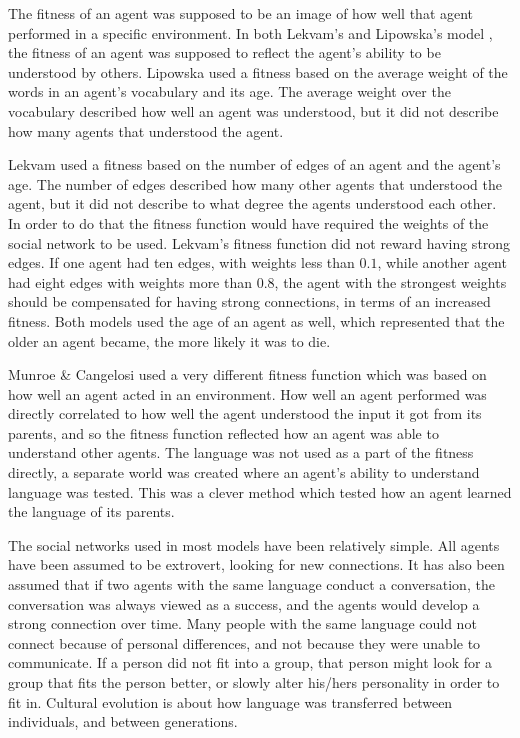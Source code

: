 The fitness of an agent was supposed to be an image of how well that agent performed in a specific environment. In both Lekvam’s \citep{lekvam2014co} and Lipowska’s model \citep{lipowska2011naming}, the fitness of an agent was supposed to reflect the agent’s ability to be understood by others. Lipowska used a fitness based on the average weight of the words in an agent’s vocabulary and its age. The average weight over the vocabulary described how well an agent was understood, but it did not describe how many agents that understood the agent. 

Lekvam used a fitness based on the number of edges of an agent and the agent’s age. The number of edges described how many other agents that understood the agent, but it did not describe to what degree the agents understood each other. In order to do that the fitness function would have required the weights of the social network to be used. Lekvam’s fitness function did not reward having strong edges. If one agent had ten edges, with weights less than $0.1$, while another agent had eight edges with weights more than $0.8$, the agent with the strongest weights should be compensated for having strong connections, in terms of an increased fitness. Both models used the age of an agent as well, which represented that the older an agent became, the more likely it was to die. 

Munroe \& Cangelosi \citep{munroe2002learning} used a very different fitness function which was based on how well an agent acted in an environment. How well an agent performed was directly correlated to how well the agent understood the input it got from its parents, and so the fitness function reflected how an agent was able to understand other agents. The language was not used as a part of the fitness directly, a separate world was created where an agent's ability to understand language was tested. This was a clever method which tested how an agent learned the language of its parents.

The social networks used in most models have been relatively simple. All agents have been assumed to be extrovert, looking for new connections. It has also been assumed that if two agents with the same language conduct a conversation, the conversation was always viewed as a success, and the agents would develop a strong connection over time. Many people with the same language could not connect because of personal differences, and not because they were unable to communicate. If a person did not fit into a group, that person might look for a group that fits the person better, or slowly alter his/hers personality in order to fit in. Cultural evolution is about how language was transferred between individuals, and between generations. 

